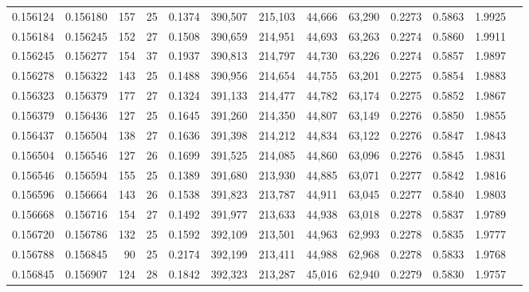 \begin{tabular}{rrrrrrrrrrrrr}
0.156124 & 0.156180 & 157 &  25 &                                     0.1374 & 390,507 & 215,103 &  44,666 &  63,290 & 0.2273 & 0.5863 & 1.9925 \\
0.156184 & 0.156245 & 152 &  27 &                                     0.1508 & 390,659 & 214,951 &  44,693 &  63,263 & 0.2274 & 0.5860 & 1.9911 \\
0.156245 & 0.156277 & 154 &  37 &                                     0.1937 & 390,813 & 214,797 &  44,730 &  63,226 & 0.2274 & 0.5857 & 1.9897 \\
0.156278 & 0.156322 & 143 &  25 &                                     0.1488 & 390,956 & 214,654 &  44,755 &  63,201 & 0.2275 & 0.5854 & 1.9883 \\
0.156323 & 0.156379 & 177 &  27 &                                     0.1324 & 391,133 & 214,477 &  44,782 &  63,174 & 0.2275 & 0.5852 & 1.9867 \\
0.156379 & 0.156436 & 127 &  25 &                                     0.1645 & 391,260 & 214,350 &  44,807 &  63,149 & 0.2276 & 0.5850 & 1.9855 \\
0.156437 & 0.156504 & 138 &  27 &                                     0.1636 & 391,398 & 214,212 &  44,834 &  63,122 & 0.2276 & 0.5847 & 1.9843 \\
0.156504 & 0.156546 & 127 &  26 &                                     0.1699 & 391,525 & 214,085 &  44,860 &  63,096 & 0.2276 & 0.5845 & 1.9831 \\
0.156546 & 0.156594 & 155 &  25 &                                     0.1389 & 391,680 & 213,930 &  44,885 &  63,071 & 0.2277 & 0.5842 & 1.9816 \\
0.156596 & 0.156664 & 143 &  26 &                                     0.1538 & 391,823 & 213,787 &  44,911 &  63,045 & 0.2277 & 0.5840 & 1.9803 \\
0.156668 & 0.156716 & 154 &  27 &                                     0.1492 & 391,977 & 213,633 &  44,938 &  63,018 & 0.2278 & 0.5837 & 1.9789 \\
0.156720 & 0.156786 & 132 &  25 &                                     0.1592 & 392,109 & 213,501 &  44,963 &  62,993 & 0.2278 & 0.5835 & 1.9777 \\
0.156788 & 0.156845 &  90 &  25 &                                     0.2174 & 392,199 & 213,411 &  44,988 &  62,968 & 0.2278 & 0.5833 & 1.9768 \\
0.156845 & 0.156907 & 124 &  28 &                                     0.1842 & 392,323 & 213,287 &  45,016 &  62,940 & 0.2279 & 0.5830 & 1.9757 \\

\end{tabular}
